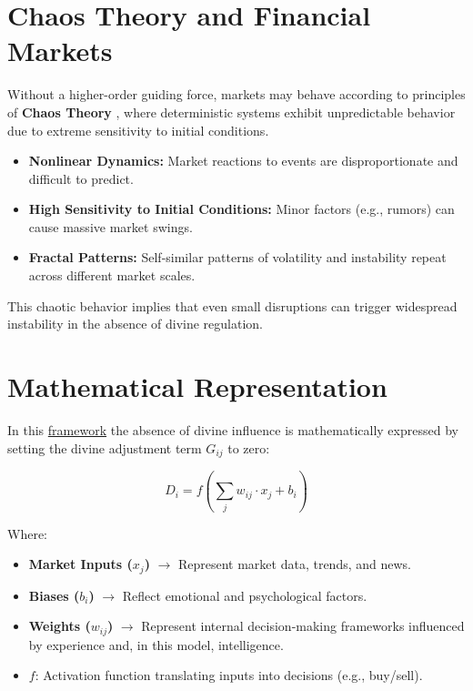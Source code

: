 \documentclass[a4]{article}
\begin{document}
\section{Chaos Theory and Financial Markets}

Without a higher-order guiding force, markets may behave according to principles of {\bf Chaos Theory} , where deterministic systems exhibit unpredictable behavior due to extreme sensitivity to initial conditions.

\begin{itemize}
\item  {\bf Nonlinear Dynamics:}  Market reactions to events are disproportionate and difficult to predict.
\item {\bf High Sensitivity to Initial Conditions:}  Minor factors (e.g., rumors) can cause massive market swings.
\item  {\bf Fractal Patterns:}  Self-similar patterns of volatility and instability repeat across different market scales.
\end{itemize}

This chaotic behavior implies that even small disruptions can trigger widespread instability in the absence of divine regulation.



\section{Mathematical Representation}

In this \href{https://blog.quantiota.ai/page/6/divine-influence-in-financial-markets-a-neural-network-analogy-of-human-decision-making/}{framework}
the absence of divine influence is mathematically expressed by setting the divine adjustment term 
$ G_{ij} $ to zero:

$$
D_i = f\left(\sum_{j} w_{ij} \cdot x_j + b_i\right)
$$

Where:

\begin{itemize}
\item  {\bf Market Inputs ($x_j$)}  $\to$ Represent market data, trends, and news.  
\item   {\bf Biases ($b_i$)}  $\to$ Reflect emotional and psychological factors.  
\item  {\bf Weights ($w_{ij}$)}  $\to$ Represent internal decision-making frameworks influenced by experience and, in this model, intelligence. 
\item  $f$:   Activation function translating inputs into decisions (e.g., buy/sell).
\end{itemize}
\end{document}
